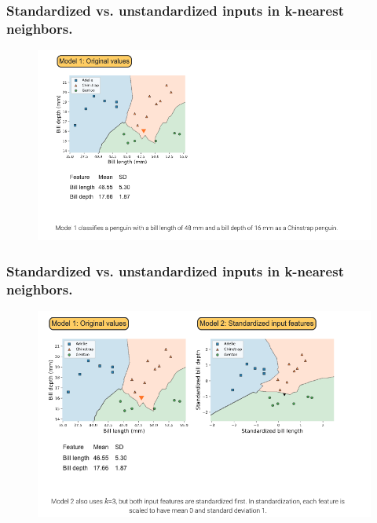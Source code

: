 \documentclass[8pt,dvipsnames]{beamer}
\begin{document}
\begin{frame}
	\frametitle{Standardized vs. unstandardized inputs in k-nearest neighbors.}
	\begin{figure}[ht]
		\centering
		\includegraphics[width=\linewidth]{imgs/knn_40.png}
	\end{figure}
\end{frame}
\begin{frame}
	\frametitle{Standardized vs. unstandardized inputs in k-nearest neighbors.}
	\begin{figure}[ht]
		\centering
		\includegraphics[width=\linewidth]{imgs/knn_41.png}
	\end{figure}
\end{frame}
\end{document}
